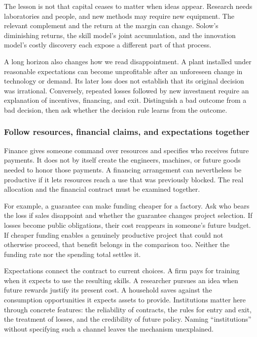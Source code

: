 The lesson is not that capital ceases to matter when ideas appear. Research
needs laboratories and people, and new methods may require new equipment.
The relevant complement and the return at the margin can change. Solow's
diminishing returns, the skill model's joint accumulation, and the innovation
model's costly discovery each expose a different part of that process.

A long horizon also changes how we read disappointment. A plant installed
under reasonable expectations can become unprofitable after an unforeseen
change in technology or demand. Its later loss does not establish that its
original decision was irrational. Conversely, repeated losses followed by
new investment require an explanation of incentives, financing, and exit.
Distinguish a bad outcome from a bad decision, then ask whether the decision
rule learns from the outcome.

\subsubsection{Follow resources, financial claims, and expectations together}

Finance gives someone command over resources and specifies who receives
future payments. It does not by itself create the engineers, machines, or
future goods needed to honor those payments. A financing arrangement can
nevertheless be productive if it lets resources reach a use that was
previously blocked. The real allocation and the financial contract must be
examined together.

For example, a guarantee can make funding cheaper for a factory. Ask who
bears the loss if sales disappoint and whether the guarantee changes project
selection. If losses become public obligations, their cost reappears in
someone's future budget. If cheaper funding enables a genuinely productive
project that could not otherwise proceed, that benefit belongs in the
comparison too. Neither the funding rate nor the spending total settles it.

Expectations connect the contract to current choices. A firm pays for
training when it expects to use the resulting skills. A researcher pursues
an idea when future rewards justify its present cost. A household saves
against the consumption opportunities it expects assets to provide.
Institutions matter here through concrete features: the reliability of
contracts, the rules for entry and exit, the treatment of losses, and the
credibility of future policy. Naming ``institutions'' without specifying
such a channel leaves the mechanism unexplained.

